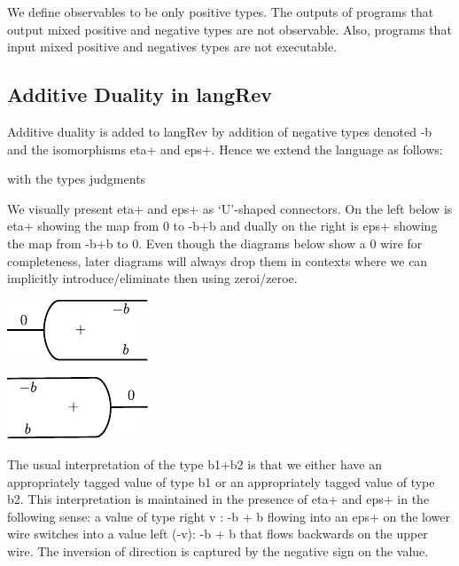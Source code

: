 \documentclass[preprint]{sigplanconf}
\begin{document}
We define observables to be only positive types. The outputs of
programs that output mixed positive and negative types are not
observable.  Also, programs that input mixed positive and negatives
types are not executable.

\subsection{Additive Duality in {{langRev}} }

Additive duality is added to {{langRev}} by addition of negative types
denoted {{-b}} and the isomorphisms {{eta+}} and {{eps+}}. Hence we
extend the language as follows:

%

\noindent
with the types judgments



We visually present {{eta+}} and {{eps+}} as `U'-shaped connectors. On
the left below is {{eta+}} showing the map from {{0}} to {{-b+b}} and
dually on the right is {{eps+}} showing the map from {{-b+b}} to
0. Even though the diagrams below show a {{0}} wire for completeness,
later diagrams will always drop them in contexts where we can
implicitly introduce/eliminate then using {{zeroi}}/{{zeroe}}.

\begin{multicols}{2}
\begin{center}
  \includegraphics{diagrams/eta.pdf}
\end{center}
  
\begin{center}
  \includegraphics{diagrams/eps.pdf}
\end{center}
\end{multicols}

The usual interpretation of the type {{b1+b2}} is that we either have
an appropriately tagged value of type {{b1}} or an appropriately
tagged value of type {{b2}}. This interpretation is maintained in the
presence of {{eta+}} and {{eps+}} in the following sense: a value of
type {{right v : -b + b}} flowing into an {{eps+}} on the lower wire
switches into a value {{left (-v): -b + b}} that flows backwards on the
upper wire. The inversion of direction is captured by the negative
sign on the value.
\end{document}
